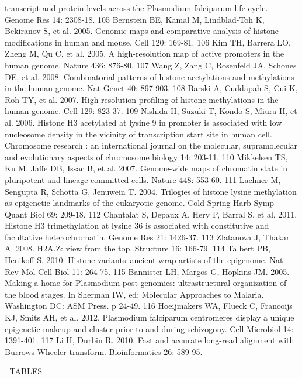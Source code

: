 transcript and protein levels across the Plasmodium falciparum life cycle.
Genome Res 14: 2308-18.
105 Bernstein BE, Kamal M, Lindblad-Toh K, Bekiranov S, et al. 2005. Genomic
maps and comparative analysis of histone modifications in human and mouse.
Cell 120: 169-81.
106 Kim TH, Barrera LO, Zheng M, Qu C, et al. 2005. A high-resolution map of
active promoters in the human genome. Nature 436: 876-80.
107 Wang Z, Zang C, Rosenfeld JA, Schones DE, et al. 2008. Combinatorial
patterns of histone acetylations and methylations in the human genome. Nat
Genet 40: 897-903.
108 Barski A, Cuddapah S, Cui K, Roh TY, et al. 2007. High-resolution
profiling of histone methylations in the human genome. Cell 129: 823-37.
109 Nishida H, Suzuki T, Kondo S, Miura H, et al. 2006. Histone H3 acetylated
at lysine 9 in promoter is associated with low nucleosome density in the
vicinity of transcription start site in human cell. Chromosome research : an
international journal on the molecular, supramolecular and evolutionary
aspects of chromosome biology 14: 203-11.
110 Mikkelsen TS, Ku M, Jaffe DB, Issac B, et al. 2007. Genome-wide maps of
chromatin state in pluripotent and lineage-committed cells. Nature 448:
553-60.
111 Lachner M, Sengupta R, Schotta G, Jenuwein T. 2004. Trilogies of histone
lysine methylation as epigenetic landmarks of the eukaryotic genome. Cold
Spring Harb Symp Quant Biol 69: 209-18.
112 Chantalat S, Depaux A, Hery P, Barral S, et al. 2011. Histone H3
trimethylation at lysine 36 is associated with constitutive and facultative
heterochromatin. Genome Res 21: 1426-37.
113 Zlatanova J, Thakar A. 2008. H2A.Z: view from the top. Structure 16:
166-79.
114 Talbert PB, Henikoff S. 2010. Histone variants--ancient wrap artists of
the epigenome. Nat Rev Mol Cell Biol 11: 264-75.
115 Bannister LH, Margos G, Hopkins JM. 2005. Making a home for Plasmodium
post-genomics: ultrastructural organization of the blood stages. In Sherman
IW, ed; Molecular Approaches to Malaria. Washington DC: ASM Press. p 24-49.
116 Hoeijmakers WA, Flueck C, Francoijs KJ, Smits AH, et al. 2012. Plasmodium
falciparum centromeres display a unique epigenetic makeup and cluster prior to
and during schizogony. Cell Microbiol 14: 1391-401.
117 Li H, Durbin R. 2010. Fast and accurate long-read alignment with
Burrows-Wheeler transform. Bioinformatics 26: 589-95.




TABLES

